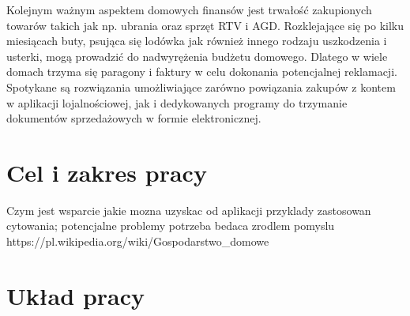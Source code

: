 Kolejnym ważnym aspektem domowych finansów jest trwałość zakupionych towarów takich jak np. ubrania oraz sprzęt RTV i AGD. Rozklejające się po kilku miesiącach buty, psująca się lodówka jak również innego rodzaju uszkodzenia i usterki, mogą prowadzić do nadwyrężenia budżetu domowego. Dlatego w wiele domach trzyma się paragony i faktury w celu dokonania potencjalnej reklamacji. Spotykane są rozwiązania umożliwiające zarówno powiązania zakupów z kontem w aplikacji lojalnościowej, jak i dedykowanych programy do trzymanie dokumentów sprzedażowych w formie elektronicznej.



\section{Cel i zakres pracy}
Czym jest wsparcie jakie mozna uzyskac od aplikacji
przyklady zastosowan cytowania;
potencjalne problemy
potrzeba bedaca zrodlem pomyslu
https://pl.wikipedia.org/wiki/Gospodarstwo_domowe
\section{Układ pracy}